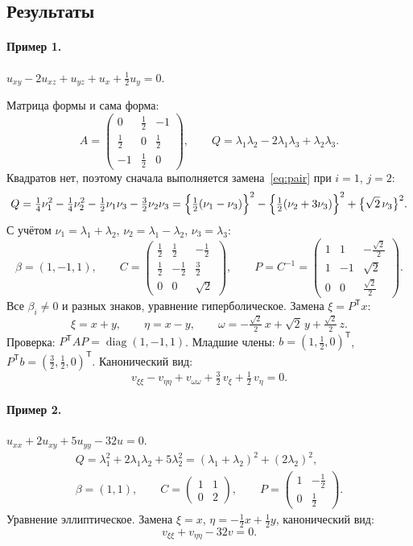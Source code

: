 \documentclass[a4paper,12pt]{article}
\DeclareMathOperator{\diag}{diag}
\begin{document}
\subsection{Результаты}

\paragraph{Пример 1.} $u_{xy}-2u_{xz}+u_{yz}+u_x+\tfrac12u_y=0$.

Матрица формы и сама форма:
\[
  A=\begin{pmatrix}0&\tfrac12&-1\\[2pt]\tfrac12&0&\tfrac12\\[2pt]-1&\tfrac12&0\end{pmatrix},
  \qquad
  Q=\lambda_1\lambda_2-2\lambda_1\lambda_3+\lambda_2\lambda_3.
\]
Квадратов нет, поэтому сначала выполняется замена~\eqref{eq:pair} при $i=1$, $j=2$:
\[
  Q=\tfrac14\nu_1^2-\tfrac14\nu_2^2-\tfrac12\nu_1\nu_3-\tfrac32\nu_2\nu_3
   =\Bigl\{\tfrac12(\nu_1-\nu_3)\Bigr\}^2-\Bigl\{\tfrac12(\nu_2+3\nu_3)\Bigr\}^2
    +\bigl\{\sqrt2\,\nu_3\bigr\}^2.
\]
С учётом $\nu_1=\lambda_1+\lambda_2$, $\nu_2=\lambda_1-\lambda_2$, $\nu_3=\lambda_3$:
\[
  \beta=(1,-1,1),\qquad
  C=\begin{pmatrix}\tfrac12&\tfrac12&-\tfrac12\\[2pt]\tfrac12&-\tfrac12&\tfrac32\\[2pt]0&0&\sqrt2\end{pmatrix},
  \qquad
  P=C^{-1}=\begin{pmatrix}1&1&-\tfrac{\sqrt2}{2}\\[2pt]1&-1&\sqrt2\\[2pt]0&0&\tfrac{\sqrt2}{2}\end{pmatrix}.
\]
Все $\beta_i\neq0$ и разных знаков, уравнение гиперболическое.
Замена $\xi=P^{\mathsf T}x$:
\[
  \xi=x+y,\qquad \eta=x-y,\qquad
  \omega=-\tfrac{\sqrt2}{2}\,x+\sqrt2\,y+\tfrac{\sqrt2}{2}\,z.
\]
Проверка: $P^{\mathsf T}\!AP=\diag(1,-1,1)$. Младшие члены: $b=(1,\tfrac12,0)^{\mathsf T}$,
$P^{\mathsf T}b=(\tfrac32,\tfrac12,0)^{\mathsf T}$. Канонический вид:
\[
  v_{\xi\xi}-v_{\eta\eta}+v_{\omega\omega}+\tfrac32\,v_\xi+\tfrac12\,v_\eta=0.
\]

\paragraph{Пример 2.} $u_{xx}+2u_{xy}+5u_{yy}-32u=0$.
\begin{gather*}
  Q=\lambda_1^2+2\lambda_1\lambda_2+5\lambda_2^2=(\lambda_1+\lambda_2)^2+(2\lambda_2)^2,\\
  \beta=(1,1),\qquad
  C=\begin{pmatrix}1&1\\0&2\end{pmatrix},\qquad
  P=\begin{pmatrix}1&-\tfrac12\\[2pt]0&\tfrac12\end{pmatrix}.
\end{gather*}
Уравнение эллиптическое. Замена $\xi=x$, $\eta=-\tfrac12x+\tfrac12y$,
канонический вид:
\[
  v_{\xi\xi}+v_{\eta\eta}-32v=0.
\]
\end{document}
